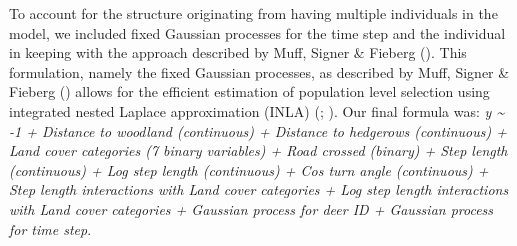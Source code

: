 \documentclass[10pt,a4paper]{article}
\begin{document}
To account for the structure originating from having multiple individuals in the model, we included fixed Gaussian processes for the time step and the individual in keeping with the approach described by Muff, Signer \& Fieberg ().
This formulation, namely the fixed Gaussian processes, as described by Muff, Signer \& Fieberg () allows for the efficient estimation of population level selection using integrated nested Laplace approximation (INLA) (; ).
Our final formula was: \emph{y \textasciitilde{} -1 + Distance to woodland (continuous) + Distance to hedgerows (continuous) + Land cover categories (7 binary variables) + Road crossed (binary) + Step length (continuous) + Log step length (continuous) + Cos turn angle (continuous) + Step length interactions with Land cover categories + Log step length interactions with Land cover categories + Gaussian process for deer ID + Gaussian process for time step}.
\end{document}
